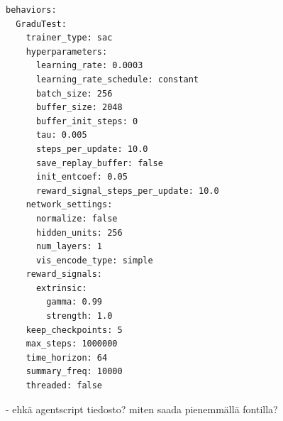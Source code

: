 \documentclass[utf8]{gradu3}
\begin{document}
\begin{verbatim}
behaviors:
  GraduTest:
    trainer_type: sac
    hyperparameters:
      learning_rate: 0.0003
      learning_rate_schedule: constant
      batch_size: 256
      buffer_size: 2048
      buffer_init_steps: 0
      tau: 0.005
      steps_per_update: 10.0
      save_replay_buffer: false
      init_entcoef: 0.05
      reward_signal_steps_per_update: 10.0
    network_settings:
      normalize: false
      hidden_units: 256
      num_layers: 1
      vis_encode_type: simple
    reward_signals:
      extrinsic:
        gamma: 0.99
        strength: 1.0
    keep_checkpoints: 5
    max_steps: 1000000
    time_horizon: 64
    summary_freq: 10000
    threaded: false
\end{verbatim}

- ehkä agentscript tiedosto? miten saada pienemmällä fontilla?
\end{document}
